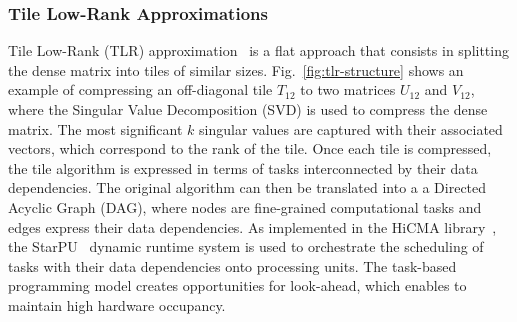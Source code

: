 \documentclass[conference]{IEEEtran}
\begin{document}
\subsubsection*{Tile Low-Rank Approximations}
Tile Low-Rank (TLR) approximation~\cite{akbudak2017tile,amestoy2015improving} is a flat approach that consists in splitting the dense matrix
into tiles of similar sizes. Fig.~\ref{fig:tlr-structure} shows an example of compressing 
an off-diagonal tile $T_{12}$ to two matrices $U_{12}$ and $V_{12}$,  
where the Singular Value Decomposition (SVD) is used to compress the dense matrix.
The most significant $k$ singular values are captured with their associated vectors, which
correspond to the rank of the tile.
Once each tile is compressed, the tile algorithm is expressed in terms of
tasks interconnected by their data dependencies. The original algorithm can then be translated into a
a Directed Acyclic Graph (DAG), where nodes are fine-grained computational tasks and edges express
their data dependencies. As implemented in the HiCMA library~\cite{hicma-soft}, the StarPU~\cite{augonnet2011starpu} dynamic runtime system
is used to orchestrate the scheduling of tasks with their data dependencies onto processing units.
The task-based programming model creates opportunities for look-ahead, which enables to maintain
high hardware occupancy.


\end{document}
